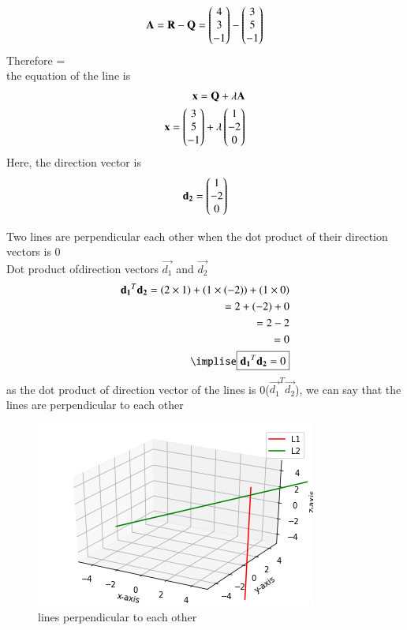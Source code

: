 \documentclass[journal,12pt,twocolumn]{IEEEtran}
\begin{document}
\begin{align}
\mathbf{A}=\mathbf{R}-\mathbf{Q}
=\begin{pmatrix}4\\3\\-1\end{pmatrix}-\begin{pmatrix}3\\5\\-1\end{pmatrix}
\end{align}
Therefore =
\\
the equation of the line is 
\begin{align}
\mathbf{x}=\mathbf{Q}+\lambda\mathbf{A}
\\
\mathbf{x}=\begin{pmatrix}3\\5\\-1\end{pmatrix}+\lambda\begin{pmatrix}1\\-2\\0\end{pmatrix}
\end{align}
Here, the direction vector is 
\begin{align}
\mathbf{d_2}=\begin{pmatrix}1\\-2\\0\end{pmatrix}
\end{align}

Two lines are perpendicular each other when the dot product of their direction vectors is 0
\\
Dot product ofdirection vectors  $\vec{d_1}$ and $\vec{d_2}$
\begin{align}
\vec{d_1}^T\vec{d_2}=(2 \times 1) +(1 \times (-2)) +(1 \times 0) 
\\
=2+(-2) +0
\\
=2-2
\\
=0
\\
\implise \boxed{\vec{d_1}^T\vec{d_2}=0}
\end{align}
as the dot product of direction vector of the lines is 0($\vec{d_1}^T\vec{d_2}$), we can say that the lines are perpendicular to each other
\begin{figure}[ht]
\centering
\includegraphics[width=\columnwidth]{download.png}
\caption{lines perpendicular to each other}
\label{Plot of the line}
\end{figure}
\end{document}
